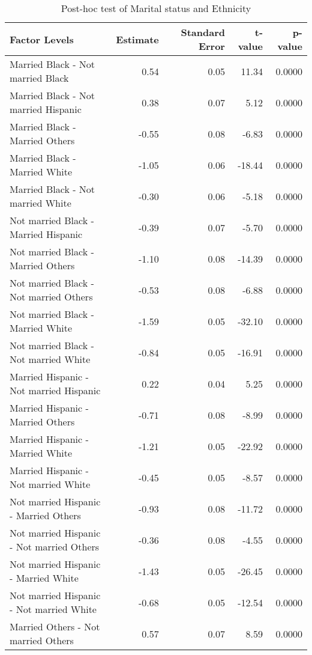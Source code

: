 \begin{table}[H]
\footnotesize
\centering
\caption{Post-hoc test of Marital status and Ethnicity} 
\begin{tabular}{lrrrr}
  \hline
Factor Levels & Estimate & Standard Error & t-value & p-value \\ 
  \hline
  Married Black -  Not married Black & 0.54 & 0.05 & 11.34 & 0.0000 \\ 
    Married Black -  Not married Hispanic & 0.38 & 0.07 & 5.12 & 0.0000 \\ 
    Married Black -  Married Others & -0.55 & 0.08 & -6.83 & 0.0000 \\ 
    Married Black -  Married White & -1.05 & 0.06 & -18.44 & 0.0000 \\ 
    Married Black -  Not married White & -0.30 & 0.06 & -5.18 & 0.0000 \\ 
    Not married Black -  Married Hispanic & -0.39 & 0.07 & -5.70 & 0.0000 \\ 
    Not married Black -  Married Others & -1.10 & 0.08 & -14.39 & 0.0000 \\ 
    Not married Black -  Not married Others & -0.53 & 0.08 & -6.88 & 0.0000 \\ 
    Not married Black -  Married White & -1.59 & 0.05 & -32.10 & 0.0000 \\ 
    Not married Black -  Not married White & -0.84 & 0.05 & -16.91 & 0.0000 \\ 
    Married Hispanic -  Not married Hispanic & 0.22 & 0.04 & 5.25 & 0.0000 \\ 
    Married Hispanic -  Married Others & -0.71 & 0.08 & -8.99 & 0.0000 \\ 
    Married Hispanic -  Married White & -1.21 & 0.05 & -22.92 & 0.0000 \\ 
    Married Hispanic -  Not married White & -0.45 & 0.05 & -8.57 & 0.0000 \\ 
    Not married Hispanic -  Married Others & -0.93 & 0.08 & -11.72 & 0.0000 \\ 
    Not married Hispanic -  Not married Others & -0.36 & 0.08 & -4.55 & 0.0000 \\ 
    Not married Hispanic -  Married White & -1.43 & 0.05 & -26.45 & 0.0000 \\ 
    Not married Hispanic -  Not married White & -0.68 & 0.05 & -12.54 & 0.0000 \\ 
    Married Others -  Not married Others & 0.57 & 0.07 & 8.59 & 0.0000 \\ 

\end{tabular}
\end{table}
